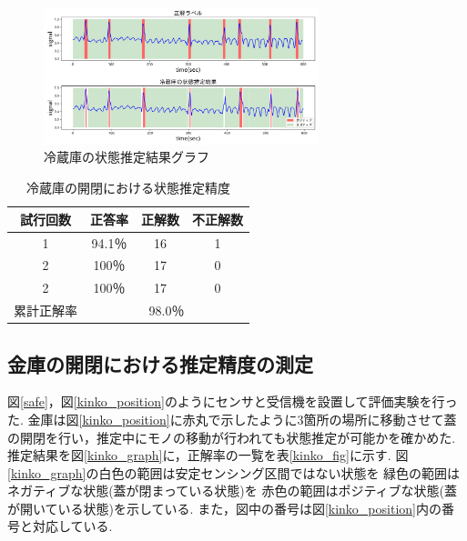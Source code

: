 \documentclass[Japanese]{dicomopapers}
\begin{document}
\begin{figure}[ht]
    \centering
    \includegraphics[width=8cm]{refrigerator_graph.png}
    \caption{冷蔵庫の状態推定結果グラフ}
    \label{refrigerator_graph}
\end{figure}



\begin{table}[htb]
    \begin{center}
        \caption{冷蔵庫の開閉における状態推定精度}
        \label{refrigerator_fig}
        \begin{tabular}{|c|c|c|c|} \hline
        試行回数 & 正答率 & 正解数 & 不正解数 \\ \hline
        1 & 94.1％ & 16 & 1 \\ \hline
        2 & 100％ & 17 & 0 \\ \hline
        2 & 100％ & 17 & 0 \\ \hline \hline
        累計正解率 & \multicolumn{3}{c|}{98.0％} \\ \hline
        \end{tabular}
    \end{center}
\end{table}



\subsection{金庫の開閉における推定精度の測定}
図\ref{safe}，図\ref{kinko_position}のようにセンサと受信機を設置して評価実験を行った.
金庫は図\ref{kinko_position}に赤丸で示したように3箇所の場所に移動させて蓋の開閉を行い，推定中にモノの移動が行われても状態推定が可能かを確かめた.
推定結果を図\ref{kinko_graph}に，正解率の一覧を表\ref{kinko_fig}に示す.
図\ref{kinko_graph}の白色の範囲は安定センシング区間ではない状態を 緑色の範囲はネガティブな状態(蓋が閉まっている状態)を 赤色の範囲はポジティブな状態(蓋が開いている状態)を示している.
また，図中の番号は図\ref{kinko_position}内の番号と対応している.
\end{document}
